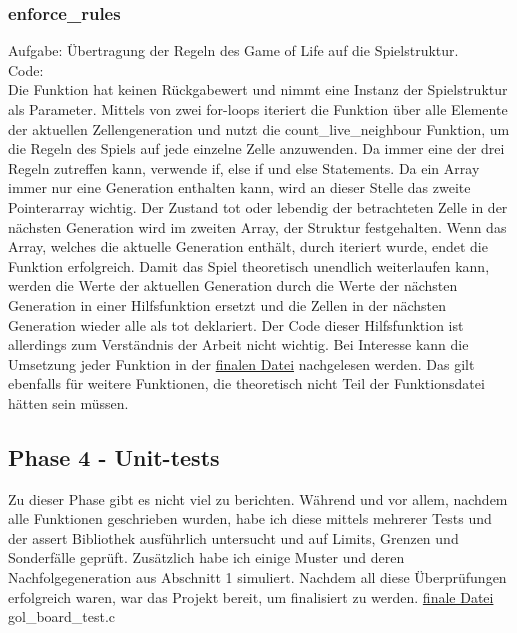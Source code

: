 \documentclass[11pt]{scrartcl}
\begin{document}
\subsubsection{enforce\_rules}
Aufgabe: Übertragung der Regeln des Game of Life auf die Spielstruktur.\\
Code:\\
Die Funktion hat keinen Rückgabewert und nimmt eine Instanz der Spielstruktur als Parameter. Mittels von zwei for-loops iteriert die Funktion über alle Elemente der aktuellen Zellengeneration und nutzt die 
count\_live\_neighbour Funktion, um die Regeln des Spiels auf jede einzelne Zelle anzuwenden. Da immer eine der drei Regeln zutreffen kann, verwende if, else if und else Statements. 
Da ein Array immer nur eine Generation enthalten kann, wird an dieser Stelle das zweite Pointerarray wichtig. Der Zustand tot oder lebendig der betrachteten Zelle in der nächsten Generation wird im zweiten 
Array, der Struktur festgehalten. Wenn das Array, welches die aktuelle Generation enthält, durch iteriert wurde, endet die Funktion erfolgreich. Damit das Spiel theoretisch unendlich weiterlaufen kann, 
werden die Werte der aktuellen Generation durch die Werte der nächsten Generation in einer Hilfsfunktion ersetzt und die Zellen in der nächsten Generation wieder alle als tot deklariert. 
Der Code dieser Hilfsfunktion ist allerdings zum Verständnis der Arbeit nicht wichtig. Bei Interesse kann die Umsetzung jeder Funktion in der \href{https://gitlab.rz.htw-berlin.de/Lennard.Wittenberg/c-project-wise-lennard-wittenberg/-/blob/main/gol_board.c}{finalen Datei} nachgelesen werden. 
Das gilt ebenfalls für weitere Funktionen, die theoretisch nicht Teil der Funktionsdatei hätten sein müssen.
\subsection{Phase 4 - Unit-tests}
Zu dieser Phase gibt es nicht viel zu berichten. Während und vor allem, nachdem alle Funktionen geschrieben wurden, habe ich diese mittels mehrerer Tests und der assert Bibliothek ausführlich untersucht und 
auf Limits, Grenzen und Sonderfälle geprüft. Zusätzlich habe ich einige Muster und deren Nachfolgegeneration aus Abschnitt 1 simuliert. Nachdem all diese Überprüfungen erfolgreich waren, 
war das Projekt bereit, um finalisiert zu werden. \href{https://gitlab.rz.htw-berlin.de/Lennard.Wittenberg/c-project-wise-lennard-wittenberg/-/blob/main/gol_board_test.c}{finale Datei} gol\_board\_test.c
\end{document}

